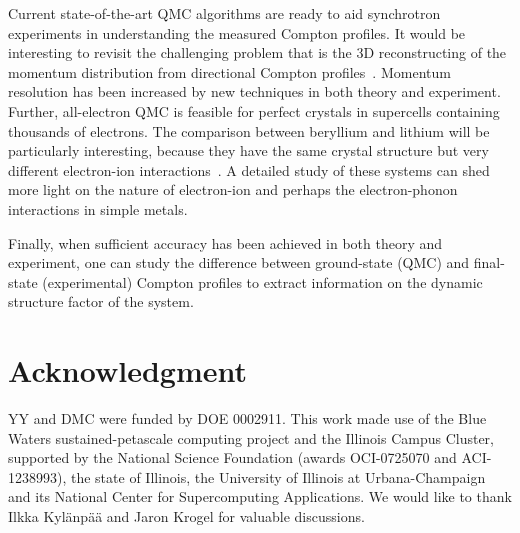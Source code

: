 \documentclass[aps,prb,showpacs,preprintnumbers,amsmath,amssymb,superscriptaddress,twocolumn]{revtex4-1}
\begin{document}
Current state-of-the-art QMC algorithms are ready to aid synchrotron experiments in understanding the measured Compton profiles. It would be interesting to revisit the challenging problem that is the 3D reconstructing of the momentum distribution from directional Compton profiles~\cite{Schulke1996,Tanaka2001}. Momentum resolution has been increased by new techniques in both theory and experiment. Further, all-electron QMC is feasible for perfect crystals in supercells containing thousands of electrons. The comparison between beryllium and lithium will be particularly interesting, because they have the same crystal structure but very different electron-ion interactions~\cite{P.EisenbergerL.LamP.M.Platzman1972}. A detailed study of these systems can shed more light on the nature of electron-ion and perhaps the electron-phonon interactions in simple metals.

Finally, when sufficient accuracy has been achieved in both theory and experiment, one can study the difference between ground-state (QMC) and final-state (experimental) Compton profiles to extract information on the dynamic structure factor of the system.

\section{Acknowledgment}

YY and DMC were funded by DOE 0002911. This work made use of the Blue Waters sustained-petascale computing project and the Illinois Campus Cluster, supported by the National Science Foundation (awards OCI-0725070 and ACI-1238993), the state of Illinois, the University of Illinois at Urbana-Champaign and its National Center for Supercomputing Applications.
We would like to thank Ilkka Kyl\"anp\"a\"a and Jaron Krogel for valuable discussions.



\end{document}
